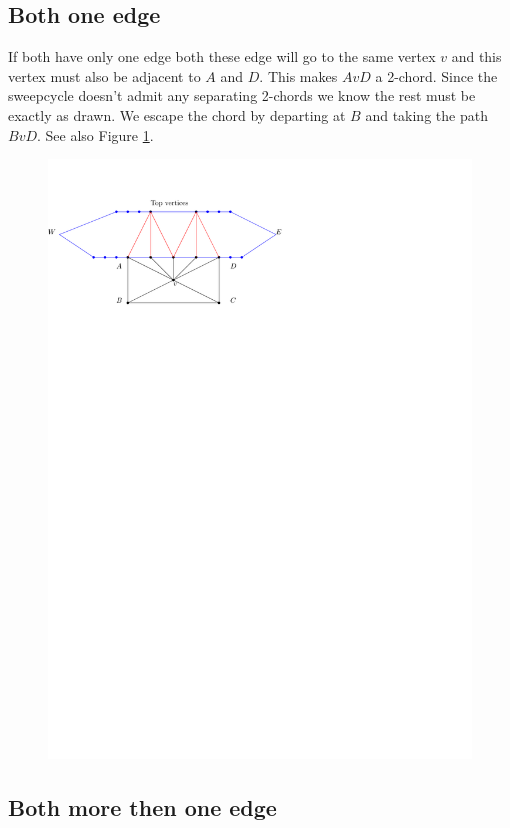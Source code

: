 \subsection{Both one edge}

If both have only one edge both these edge will go to the same vertex $v$ and this vertex must also be adjacent to $A$ and $D$. This makes $AvD$ a 2-chord. Since the sweepcycle doesn't admit any separating 2-chords we know the rest must be exactly as drawn. We escape the chord by departing at $B$ and taking the path $BvD$.
See also Figure \ref{fig:chord:oneonefan}.

\begin{figure}[h]
  \centering
  \includegraphics[scale=1]{chordShrink/img/oneonefan}
  \caption{}
  \label{fig:chord:oneonefan}
\end{figure}


\subsection{Both more then one edge}

